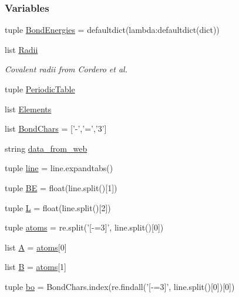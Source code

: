 \subsubsection*{Variables}
\begin{DoxyCompactItemize}
\item 
tuple \hyperlink{namespaceforcebalance_1_1chemistry_aa5baf093f9cb069966eae63492327221}{Bond\-Energies} = defaultdict(lambda\-:defaultdict(dict))
\item 
list \hyperlink{namespaceforcebalance_1_1chemistry_a5b56f8045a8e79c5b088a58695fa460f}{Radii}
\begin{DoxyCompactList}\small\item\em Covalent radii from Cordero et al. \end{DoxyCompactList}\item 
tuple \hyperlink{namespaceforcebalance_1_1chemistry_a16a882da023657ddee2421d09da00ca7}{Periodic\-Table}
\item 
list \hyperlink{namespaceforcebalance_1_1chemistry_a52ebc743ef6b24dbe00504b72490996c}{Elements}
\item 
list \hyperlink{namespaceforcebalance_1_1chemistry_ac5fcb01c4de1456a654dd920150069f3}{Bond\-Chars} = \mbox{[}'-\/','=','3'\mbox{]}
\item 
string \hyperlink{namespaceforcebalance_1_1chemistry_a4080110f15046bfd2f27bbb60ba2ef66}{data\-\_\-from\-\_\-web}
\item 
tuple \hyperlink{namespaceforcebalance_1_1chemistry_a5a3b715a402d39a5da6ae558e400ce85}{line} = line.\-expandtabs()
\item 
tuple \hyperlink{namespaceforcebalance_1_1chemistry_a147524ef7449edeb6a5996f861f00d7c}{B\-E} = float(line.\-split()\mbox{[}1\mbox{]})
\item 
tuple \hyperlink{namespaceforcebalance_1_1chemistry_ad5838ecc45d68a3a29f0c2518ceaaca2}{L} = float(line.\-split()\mbox{[}2\mbox{]})
\item 
tuple \hyperlink{namespaceforcebalance_1_1chemistry_ab17d5407c5d506aba3077ed57ffd9b97}{atoms} = re.\-split('\mbox{[}-\/=3\mbox{]}', line.\-split()\mbox{[}0\mbox{]})
\item 
list \hyperlink{namespaceforcebalance_1_1chemistry_a352fe220850f433a698a751ed1210881}{A} = \hyperlink{namespaceforcebalance_1_1chemistry_ab17d5407c5d506aba3077ed57ffd9b97}{atoms}\mbox{[}0\mbox{]}
\item 
list \hyperlink{namespaceforcebalance_1_1chemistry_a67544d273d0599a13b4c6ad98302ed21}{B} = \hyperlink{namespaceforcebalance_1_1chemistry_ab17d5407c5d506aba3077ed57ffd9b97}{atoms}\mbox{[}1\mbox{]}
\item 
tuple \hyperlink{namespaceforcebalance_1_1chemistry_a69da1f7f7b3940c14cc2b61e2bc64dd0}{bo} = Bond\-Chars.\-index(re.\-findall('\mbox{[}-\/=3\mbox{]}', line.\-split()\mbox{[}0\mbox{]})\mbox{[}0\mbox{]})
\end{DoxyCompactItemize}


